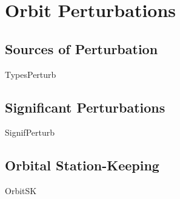 \chapter{Orbit Perturbations}\label{ch:Pert}


\section{Sources of Perturbation}
{TypesPerturb}

\section{Significant Perturbations}
{SignifPerturb}


\section{Orbital Station-Keeping}
{OrbitSK}
